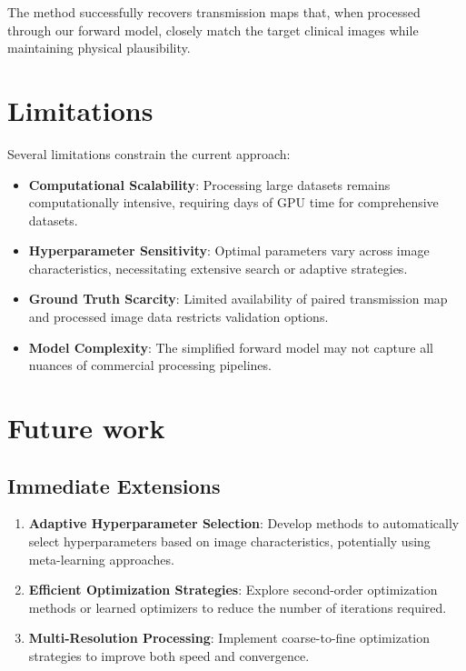 \documentclass[nomenclature, english, bibtex]{kththesis}
\numberwithin{listing}{chapter}
\begin{document}
The method successfully recovers transmission maps that, when processed through our forward model, closely match the target clinical images while maintaining physical plausibility.

\section{Limitations}
\label{sec:limitations}

Several limitations constrain the current approach:

\begin{itemize}
    \item \textbf{Computational Scalability}: Processing large datasets remains computationally intensive, requiring days of GPU time for comprehensive datasets.

    \item \textbf{Hyperparameter Sensitivity}: Optimal parameters vary across image characteristics, necessitating extensive search or adaptive strategies.

    \item \textbf{Ground Truth Scarcity}: Limited availability of paired transmission map and processed image data restricts validation options.

    \item \textbf{Model Complexity}: The simplified forward model may not capture all nuances of commercial processing pipelines.
\end{itemize}

\section{Future work}
\label{sec:futureWork}

\subsection{Immediate Extensions}
\begin{enumerate}
    \item \textbf{Adaptive Hyperparameter Selection}: Develop methods to automatically select hyperparameters based on image characteristics, potentially using meta-learning approaches.

    \item \textbf{Efficient Optimization Strategies}: Explore second-order optimization methods or learned optimizers to reduce the number of iterations required.

    \item \textbf{Multi-Resolution Processing}: Implement coarse-to-fine optimization strategies to improve both speed and convergence.
\end{enumerate}
\end{document}
